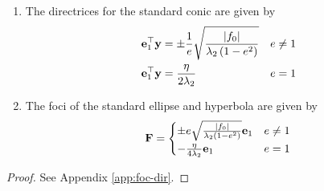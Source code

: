     \begin{theorem}\leavevmode
		\begin{enumerate}
			\item The directrices for the  standard conic are given by 
				\begin{align}
					\label{eq:dx-ell-hyp}
					\mathbf{e}_1^{\top}\mathbf{y} &=  
					\pm \frac{1}{e}\sqrt{\frac{\left\vert f_0\right\vert}{\lambda_2\left(1-e^2\right)}} & e \ne 1
					\\
					\mathbf{e}_1^{\top}\mathbf{y} &= \frac{\eta}{2\lambda_2} & e = 1
					\label{eq:dx-parab}
				\end{align}
    \item The foci of the standard ellipse and hyperbola are given by 
				\begin{align}
					\label{eq:F-ell-hyp-parab}
					\mathbf{F} 
=
					\begin{cases}
						\pm e\sqrt{\frac{\left\vert f_0\right\vert}{\lambda_2\left(1-e^2\right)}}\mathbf{e}_1 & e \ne 1
						\\
						 -\frac{\eta}{4\lambda_2}\mathbf{e}_1 & e = 1
					\end{cases}
				\end{align}
	
		\end{enumerate}
    \end{theorem}
	\begin{proof}%
		See Appendix \ref{app:foc-dir}.
	\end{proof}
